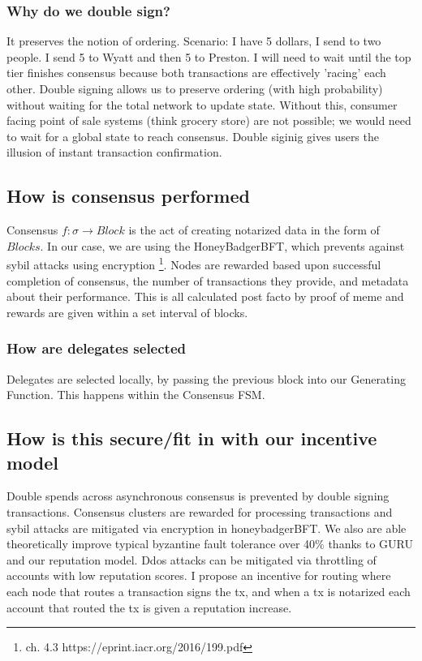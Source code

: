 \documentclass{article}
\begin{document}
\subsubsection{Why do we double sign?}
It preserves the notion of ordering. Scenario: I have 5 dollars, I send to two people. I send 5 to Wyatt and then 5 to Preston. I will need to wait until the top tier finishes consensus because both transactions are effectively 'racing' each other. Double signing allows us to preserve ordering (with high probability) without waiting for the total network to update state. Without this, consumer facing point of sale systems (think grocery store) are not possible; we would need to wait for a global state to reach consensus. Double siginig gives users the illusion of instant transaction confirmation.

\subsection{How is consensus performed}
Consensus $f: \sigma \rightarrow  Block$ is the act of creating notarized data in the form of $Blocks$. In our case, we are using the HoneyBadgerBFT, which prevents against sybil attacks using encryption \footnote{ch. 4.3 https://eprint.iacr.org/2016/199.pdf}. Nodes are rewarded based upon successful completion of consensus, the number of transactions they provide, and metadata about their performance. This is all calculated post facto by proof of meme and rewards are given within a set interval of blocks.

\subsubsection{How are delegates selected}
Delegates are selected locally, by passing the previous block into our Generating Function. This happens within the Consensus FSM.

\subsection{How is this secure/fit in with our incentive model}
Double spends across asynchronous consensus is prevented by double signing transactions. Consensus clusters are rewarded for processing transactions and sybil attacks are mitigated via encryption in honeybadgerBFT. We also are able theoretically improve typical byzantine fault tolerance over 40\% thanks to GURU and our reputation model. Ddos attacks can be mitigated via throttling of accounts with low reputation scores. I propose an incentive for routing where each node that routes a transaction signs the tx, and when a tx is notarized each account that routed the tx is given a reputation increase.


\end{document}
